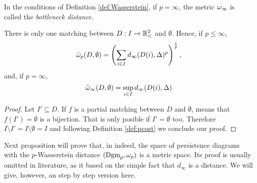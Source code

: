 \begin{definition}
    In the conditions of Definition \ref{def:Wasserstein}, if $ p = \infty $, the metric $ \omega_\infty $ is called the {\it bottleneck distance}.
\end{definition}

\begin{proposition} \label{prop-empty-mathing-distance}
    There is only one matching between $ D: I \to \mathbb{R}_<^2 $ and $ \emptyset $. Hence, if $ p \leq \infty $,
    \begin{equation}
        \tilde \omega_p(D, \emptyset) = \left(\sum_{i\in I} d_\infty(D(i), \Delta)^p\right)^{\frac{1}{p}},
    \end{equation}
    and, if $ p = \infty $,
    \begin{equation}
        \tilde \omega_\infty(D, \emptyset) = \sup_{i\in I} d_\infty(D(i), \Delta)
    \end{equation}
\end{proposition}
\begin{proof}
    Let $ I' \subseteq D $. If $ f $ is a partial matching between $ D $ and $ \emptyset $, means that $ f(I') = \emptyset$ is a bijection. That is only posible if $ I' = \emptyset $ too. Therefore $ I \setminus I' = I \setminus \emptyset = I $ and following Definition \ref{def:pcost} we conclude our proof.
\end{proof}

Next proposition will prove that, in indeed, the space of persistence diagrams with the $p$-Wasserstein distance $(\operatorname{Dgm}_p, \omega_p)$ is a metric space. Its proof is usually omitted in literature, as it based on the simple fact that $ d_\infty $ is a distance. We will give, however, an step by step version here.

